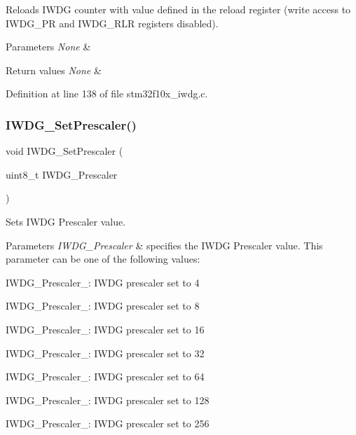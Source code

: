 Reloads I\+W\+DG counter with value defined in the reload register (write access to I\+W\+D\+G\+\_\+\+PR and I\+W\+D\+G\+\_\+\+R\+LR registers disabled). 


\begin{DoxyParams}{Parameters}
{\em None} & \\
\hline
\end{DoxyParams}

\begin{DoxyRetVals}{Return values}
{\em None} & \\
\hline
\end{DoxyRetVals}


Definition at line 138 of file stm32f10x\+\_\+iwdg.\+c.

\mbox{\label{group___i_w_d_g___private___functions_ga4fa7f1cd690533a35ad9e4729c0450a3}} 
\subsubsection{\texorpdfstring{I\+W\+D\+G\+\_\+\+Set\+Prescaler()}{IWDG\_SetPrescaler()}}
{\footnotesize\ttfamily void I\+W\+D\+G\+\_\+\+Set\+Prescaler (\begin{DoxyParamCaption}\item[{uint8\+\_\+t}]{I\+W\+D\+G\+\_\+\+Prescaler }\end{DoxyParamCaption})}



Sets I\+W\+DG Prescaler value. 


\begin{DoxyParams}{Parameters}
{\em I\+W\+D\+G\+\_\+\+Prescaler} & specifies the I\+W\+DG Prescaler value. This parameter can be one of the following values\+: \begin{DoxyItemize}
\item I\+W\+D\+G\+\_\+\+Prescaler\+\_\+: I\+W\+DG prescaler set to 4 \item I\+W\+D\+G\+\_\+\+Prescaler\+\_\+: I\+W\+DG prescaler set to 8 \item I\+W\+D\+G\+\_\+\+Prescaler\+\_\+: I\+W\+DG prescaler set to 16 \item I\+W\+D\+G\+\_\+\+Prescaler\+\_\+: I\+W\+DG prescaler set to 32 \item I\+W\+D\+G\+\_\+\+Prescaler\+\_\+: I\+W\+DG prescaler set to 64 \item I\+W\+D\+G\+\_\+\+Prescaler\+\_\+: I\+W\+DG prescaler set to 128 \item I\+W\+D\+G\+\_\+\+Prescaler\+\_\+: I\+W\+DG prescaler set to 256 \end{DoxyItemize}
\\
\hline
\end{DoxyParams}

